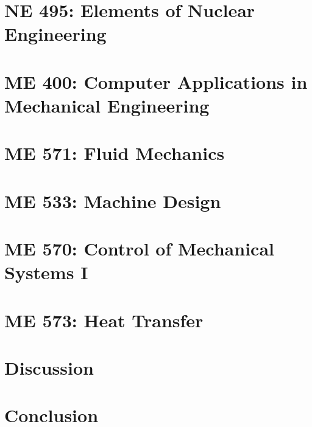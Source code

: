 \documentclass[12pt]{report}
\begin{document}
    \clearpage
    \chapter{NE 495: Elements of Nuclear Engineering}
    
    
    \clearpage
    \chapter{ME 400: Computer Applications in Mechanical Engineering}
    
    
    \clearpage
    \chapter{ME 571: Fluid Mechanics}
    

    \clearpage
    \chapter{ME 533: Machine Design}
    

    \clearpage
    \chapter{ME 570: Control of Mechanical Systems I}
    

    \clearpage
    \chapter{ME 573: Heat Transfer}
    
    
    \clearpage
    \chapter{Discussion}
    

    \clearpage
    \chapter{Conclusion}
    

    \clearpage
    \nocite{*}
\end{document}
